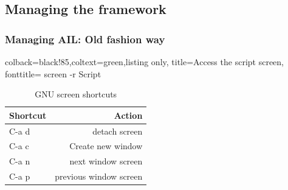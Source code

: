 \documentclass{beamer}
\begin{document}
\subsection{Managing the framework}
\begin{frame}[fragile]
    \frametitle{Managing AIL: Old fashion way}
    \lstset{style=bash}
    \begin{tcblisting}{colback=black!85,coltext=green,listing only,
        title=Access the script screen, fonttitle=\bfseries}
screen -r Script
\end{tcblisting}
\begin{table}
        \caption{GNU screen shortcuts}
    \begin{tabular}{lr}
        \toprule
        Shortcut & Action \\
        \midrule
        C-a d & detach screen \\
        \midrule
        C-a c & Create new window \\
        \midrule
        C-a n & next window screen \\
        \midrule
        C-a p & previous window screen \\
        \bottomrule
    \end{tabular}
\end{table}
\end{frame}
\end{document}

